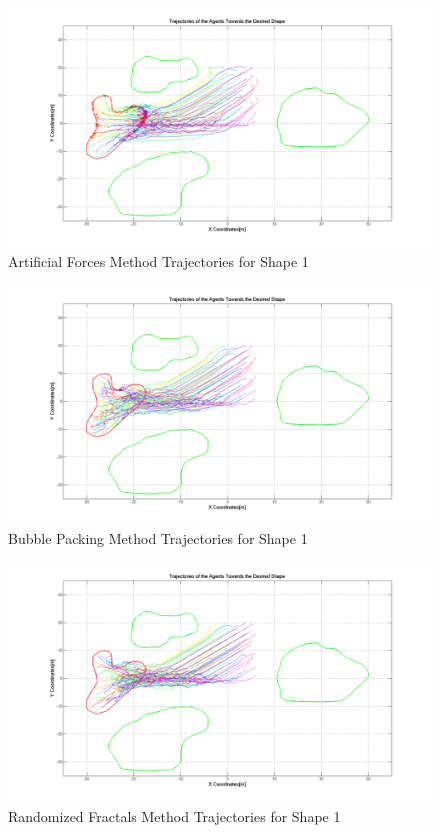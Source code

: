\documentclass[twoside]{article}
\begin{document}
			\begin{figure}[H]
				\caption{Artificial Forces Method Trajectories for Shape 1}
				\centerline{\includegraphics[scale = 0.35]{Aritificial_Trajecories_1}}
			\end{figure} 	

		\begin{figure}[H]
			\caption{Bubble Packing Method Trajectories for Shape 1}
			\centerline{\includegraphics[scale = 0.35]{Bubble_Trajectories_1}}
		\end{figure} 	
		
			\begin{figure}[H]
				\caption{Randomized Fractals Method Trajectories for Shape 1}
				\centerline{\includegraphics[scale = 0.35]{Randomized_Trajectories_1}}
			\end{figure} 	
			
\end{document}
